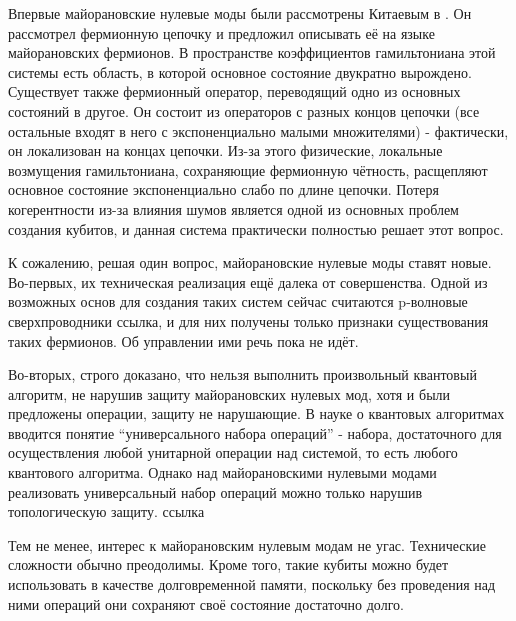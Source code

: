 \documentclass[a4paper,12pt]{article}
\theoremstyle{plain} %
\theoremstyle{definition} %
\theoremstyle{remark} %
\begin{document}
Впервые майорановские нулевые моды были рассмотрены Китаевым в \cite{kitaev}. Он рассмотрел фермионную цепочку и предложил описывать её на языке майорановских фермионов. В пространстве коэффициентов гамильтониана этой системы есть область, в которой основное состояние двукратно вырождено. Существует также фермионный оператор, переводящий одно из основных состояний в другое. Он состоит из операторов с разных концов цепочки (все остальные входят в него с экспоненциально малыми множителями) - фактически, он локализован на концах цепочки. Из-за этого физические, локальные возмущения гамильтониана, сохраняющие фермионную чётность, расщепляют основное состояние экспоненциально слабо по длине цепочки. Потеря когерентности из-за влияния шумов является одной из основных проблем создания кубитов, и данная система практически полностью решает этот вопрос.

К сожалению, решая один вопрос, майорановские нулевые моды ставят новые. Во-первых, их техническая реализация ещё далека от совершенства. Одной из возможных основ для создания таких систем сейчас считаются p-волновые сверхпроводники {\color{red}ссылка}, и для них получены только признаки существования таких фермионов. Об управлении ими речь пока не идёт.

Во-вторых, строго доказано, что нельзя выполнить произвольный квантовый алгоритм, не нарушив защиту майорановских нулевых мод, хотя и были предложены операции, защиту не нарушающие. В науке о квантовых алгоритмах вводится понятие ``универсального набора операций'' - набора, достаточного для осуществления любой унитарной операции над системой, то есть любого квантового алгоритма. Однако над майорановскими нулевыми модами реализовать универсальный набор операций можно только нарушив топологическую защиту. {\color{red}ссылка}

Тем не менее, интерес к майорановским нулевым модам не угас. Технические сложности обычно преодолимы. Кроме того, такие кубиты можно будет использовать в качестве долговременной памяти, поскольку без проведения над ними операций они сохраняют своё состояние достаточно долго.
\end{document}
